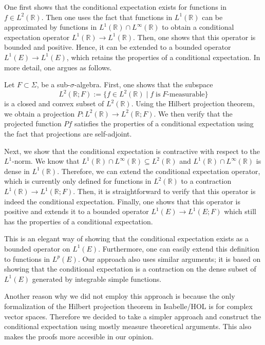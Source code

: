One first shows that the conditional expectation exists for functions in $f \in L^2(\mathbb{R})$. Then one uses the fact that functions in $L^1(\mathbb{R})$ can be approximated by functions in $L^1(\mathbb{R}) \cap L^\infty(\mathbb{R})$ to obtain a conditional expectation operator $L^1(\mathbb{R})\rightarrow L^1(\mathbb{R})$. Then, one shows that this operator is bounded and positive. Hence, it can be extended to a bounded operator $L^1(E)\rightarrow L^1(E)$, which retains the properties of a conditional expectation. In more detail, one argues as follows. 

Let $F \subset \Sigma$, be a sub-$\sigma$-algebra. First, one shows that the subspace 
\[
	L^2(\mathbb{R}; F) := \{f \in L^2(\mathbb{R}) \;\vert\; f \; \textrm{is} \; F\textrm{-measurable}\}
\] is a closed and convex subset of $L^2(\mathbb{R})$. Using the Hilbert projection theorem, we obtain a projection $P : L^2(\mathbb{R}) \rightarrow L^2(\mathbb{R}; F)$. We then verify that the projected function $Pf$ satisfies the properties of a conditional expectation using the fact that projections are self-adjoint. 

Next, we show that the conditional expectation is contractive with respect to the $L^1$-norm. We know that $L^1(\mathbb{R}) \cap L^\infty(\mathbb{R}) \subseteq L^2(\mathbb{R})$ and $L^1(\mathbb{R}) \cap L^\infty(\mathbb{R})$ is dense in $L^1(\mathbb{R})$. Therefore, we can extend the conditional expectation operator, which is currently only defined for functions in $L^2(\mathbb{R})$ to a contraction $L^1(\mathbb{R}) \rightarrow L^1(\mathbb{R}; F)$. Then, it is straightforward to verify that this operator is indeed the conditional expectation. Finally, one shows that this operator is positive and extends it to a bounded operator $L^1(E)\rightarrow L^1(E; F)$ which still has the properties of a conditional expectation.

This is an elegant way of showing that the conditional expectation exists as a bounded operator on $L^1(E)$. Furthermore, one can easily extend this definition to functions in $L^p(E)$. Our approach also uses similar arguments; it is based on showing that the conditional expectation is a contraction on the dense subset of $L^1(E)$ generated by integrable simple functions. 

Another reason why we did not employ this approach is because the only formalization of the Hilbert projection theorem in Isabelle/HOL is for complex vector spaces. Therefore we decided to take a simpler approach and construct the conditional expectation using mostly measure theoretical arguments. This also makes the proofs more accesible in our opinion.

